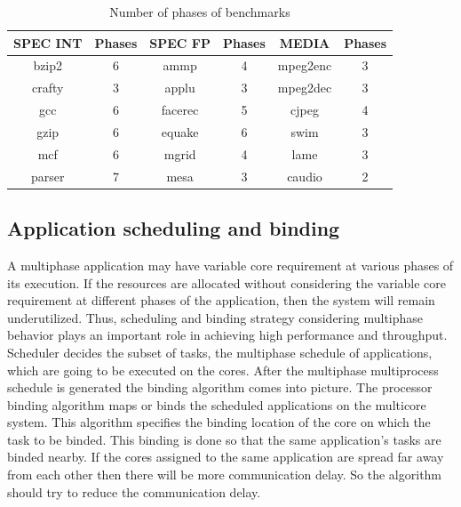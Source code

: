 \documentclass[10pt, conference]{IEEEtran}
\begin{document}

\begin{table} [tb]
\centering
\footnotesize
\setlength{\tabcolsep}{0.7mm}
\begin{tabular}{|c|c| |c|c| |c|c|}
\hline
\textbf{SPEC INT} & \textbf{Phases} & \textbf{SPEC FP} & \textbf{Phases} & \textbf{MEDIA} & \textbf{Phases} \\
\hline
bzip2 & 6 & ammp & 4 & mpeg2enc & 3 \\
\hline
crafty & 3 & applu & 3 & mpeg2dec & 3 \\
\hline
gcc & 6 & facerec  & 5   & cjpeg & 4 \\
\hline
gzip & 6 & equake & 6 & swim & 3 \\
\hline
mcf & 6 &  mgrid & 4   & lame & 3 \\
\hline
parser & 7 & mesa & 3 & caudio & 2 \\
\hline

\end{tabular}
\vspace{-0.1cm}\caption{Number of phases of benchmarks \cite{Benerjee08}}
\vspace{-0.3cm}
\label{mpdetection}
\end{table}

\subsection{Application scheduling and binding}

A multiphase application may have variable core requirement at various phases of its execution. If the resources are allocated without considering the variable core requirement at different phases of the application, then the system will remain underutilized. Thus, scheduling and binding strategy considering multiphase behavior plays an important role in achieving high performance and throughput. Scheduler decides the subset of tasks, the multiphase schedule of applications, which are going to be executed on the cores. After the multiphase multiprocess schedule is generated the binding algorithm comes into picture. The processor binding algorithm maps or binds the scheduled applications on the multicore system. This algorithm specifies the binding location of the core on which the task to be binded. This binding is done so that the same application's tasks are binded nearby. If the cores assigned to the same application are spread far away from each other then there will be more communication delay. So the algorithm should try to reduce the communication delay.
\end{document}
